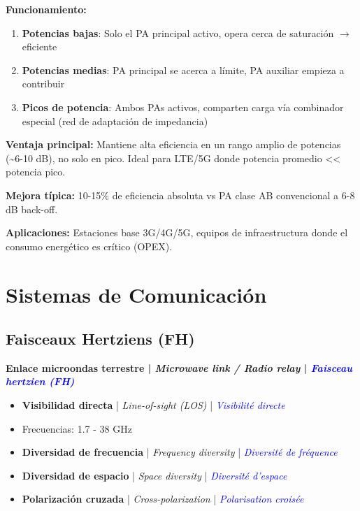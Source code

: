 \documentclass[a4paper,10pt]{article}
\begin{document}
\textbf{Funcionamiento:}
\begin{enumerate}
    \item \textbf{Potencias bajas}: Solo el PA principal activo, opera cerca de saturaci\'on $\rightarrow$ eficiente
    \item \textbf{Potencias medias}: PA principal se acerca a l\'imite, PA auxiliar empieza a contribuir
    \item \textbf{Picos de potencia}: Ambos PAs activos, comparten carga v\'ia combinador especial (red de adaptaci\'on de impedancia)
\end{enumerate}

\textbf{Ventaja principal:} Mantiene alta eficiencia en un rango amplio de potencias (\textasciitilde{}6-10 dB), no solo en pico. Ideal para LTE/5G donde potencia promedio << potencia pico.

\textbf{Mejora t\'ipica:} 10-15\% de eficiencia absoluta vs PA clase AB convencional a 6-8 dB back-off.

\textbf{Aplicaciones:} Estaciones base 3G/4G/5G, equipos de infraestructura donde el consumo energ\'etico es cr\'itico (OPEX).

\section{Sistemas de Comunicaci\'on}

\subsection{Faisceaux Hertziens (FH)}

\textbf{Enlace microondas terrestre | \textit{Microwave link / Radio relay} | \textcolor{blue}{\textit{Faisceau hertzien (FH)}}}

\begin{itemize}[leftmargin=*]
    \item \textbf{Visibilidad directa} | \textit{Line-of-sight (LOS)} | \textcolor{blue}{\textit{Visibilit\'e directe}}
    \item Frecuencias: 1.7 - 38 GHz
    \item \textbf{Diversidad de frecuencia} | \textit{Frequency diversity} | \textcolor{blue}{\textit{Diversit\'e de fr\'equence}}
    \item \textbf{Diversidad de espacio} | \textit{Space diversity} | \textcolor{blue}{\textit{Diversit\'e d'espace}}
    \item \textbf{Polarizaci\'on cruzada} | \textit{Cross-polarization} | \textcolor{blue}{\textit{Polarisation crois\'ee}}
\end{itemize}
\end{document}
